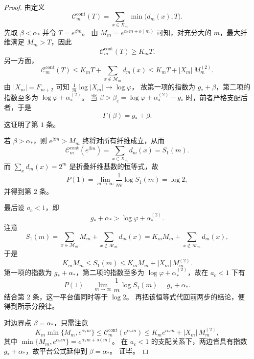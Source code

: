 \begin{proof}
由定义
\[
\mathcal C_m^{\mathrm{cont}}(T)
=
\sum_{x\in X_m}\min\bigl(d_m(x),T\bigr).
\]
先取 \(\beta<\alpha_\ast\) 并令 \(T=e^{\beta m}\)。
由 \(M_m=e^{\alpha_\ast m+o(m)}\) 可知，对充分大的 \(m\)，最大纤维满足 \(M_m>T\)，因此
\[
\mathcal C_m^{\mathrm{cont}}(T)\ge K_mT.
\]
另一方面，
\[
\mathcal C_m^{\mathrm{cont}}(T)
\le
K_mT+\sum_{x\notin\mathcal M_m}d_m(x)
\le
K_mT+|X_m|\,M_m^{(2)}.
\]
由 \(|X_m|=F_{m+2}\) 可知
\(
\frac1m\log|X_m|\to\log\varphi
\)，
故第一项的指数为 \(g_\ast+\beta\)，第二项的指数至多为
\(\log\varphi+\alpha_\ast^{(2)}\)。
当 \(\beta>\beta_c=\log\varphi+\alpha_\ast^{(2)}-g_\ast\) 时，前者严格支配后者，于是
\[
\Gamma(\beta)=g_\ast+\beta.
\]
这证明了第 \(1\) 条。
\par
若 \(\beta>\alpha_\ast\)，则 \(e^{\beta m}>M_m\) 终将对所有纤维成立，从而
\[
\mathcal C_m^{\mathrm{cont}}(e^{\beta m})
=
\sum_{x\in X_m}d_m(x)
=
S_1(m).
\]
而 \(\sum_x d_m(x)=2^m\) 是折叠纤维基数的恒等式，故
\[
P(1)=\lim_{m\to\infty}\frac1m\log S_1(m)=\log 2,
\]
并得到第 \(2\) 条。
\par
最后设 \(a_c<1\)，即
\[
g_\ast+\alpha_\ast>\log\varphi+\alpha_\ast^{(2)}.
\]
注意
\[
S_1(m)
=
\sum_{x\in\mathcal M_m}M_m+\sum_{x\notin\mathcal M_m}d_m(x)
=
K_mM_m+\sum_{x\notin\mathcal M_m}d_m(x),
\]
于是
\[
K_mM_m\le S_1(m)\le K_mM_m+|X_m|\,M_m^{(2)}.
\]
第一项的指数为 \(g_\ast+\alpha_\ast\)，第二项的指数至多为
\(\log\varphi+\alpha_\ast^{(2)}\)，故在 \(a_c<1\) 下有
\[
P(1)=\lim_{m\to\infty}\frac1m\log S_1(m)=g_\ast+\alpha_\ast.
\]
结合第 \(2\) 条，这一平台值同时等于 \(\log 2\)。
再把该恒等式代回前两步的结论，便得到所示分段律。
\par
对边界点 \(\beta=\alpha_\ast\)，只需注意
\[
K_m\min\{M_m,e^{\alpha_\ast m}\}
\le
\mathcal C_m^{\mathrm{cont}}(e^{\alpha_\ast m})
\le
K_m e^{\alpha_\ast m}+|X_m|\,M_m^{(2)},
\]
其中
\(
\min\{M_m,e^{\alpha_\ast m}\}=e^{\alpha_\ast m+o(m)}
\)。
在 \(a_c<1\) 的支配关系下，两边皆具有指数 \(g_\ast+\alpha_\ast\)，故平台公式延伸到
\(\beta=\alpha_\ast\)。
证毕。
\end{proof}

